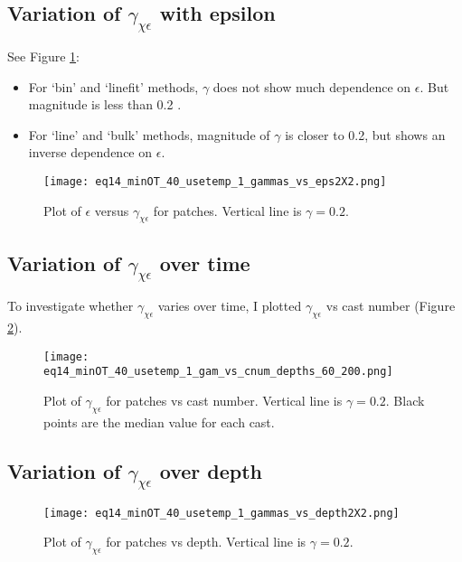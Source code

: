 \documentclass[11pt]{article}
\begin{document}
\clearpage
\subsection{Variation of $\gamma_{\chi\epsilon}$ with epsilon}

See Figure \ref{epsvsgam}:
\begin{itemize}
\item For `bin' and `linefit' methods, $\gamma$ does not show much dependence on $\epsilon$. But magnitude is less than 0.2 .
\item For `line' and `bulk' methods, magnitude of $\gamma$ is closer to 0.2, but shows an inverse dependence on $\epsilon$.
\end{itemize}


\begin{figure}[htbp]
\texttt{[image: eq14\_minOT\_40\_usetemp\_1\_gammas\_vs\_eps2X2.png]}
\caption{Plot of $\epsilon$  versus $\gamma_{\chi\epsilon}$ for patches.  Vertical line is $\gamma=0.2$.}
\label{epsvsgam}
\end{figure}




\clearpage
\subsection{Variation of $\gamma_{\chi\epsilon}$ over time}

To investigate whether $\gamma_{\chi\epsilon}$ varies over time, I plotted $\gamma_{\chi\epsilon}$ vs cast number (Figure \ref{gamvscnum}).

\begin{figure}[htbp]
\texttt{[image: eq14\_minOT\_40\_usetemp\_1\_gam\_vs\_cnum\_depths\_60\_200.png]}
\caption{Plot of $\gamma_{\chi\epsilon}$ for patches vs cast number. Vertical line is $\gamma=0.2$. Black points are the median value for each cast.}
\label{gamvscnum}
\end{figure}




\clearpage
\subsection{Variation of $\gamma_{\chi\epsilon}$ over depth}

\begin{figure}[htbp]
\texttt{[image: eq14\_minOT\_40\_usetemp\_1\_gammas\_vs\_depth2X2.png]}
\caption{Plot of $\gamma_{\chi\epsilon}$ for patches vs depth. Vertical line is $\gamma=0.2$. }
\label{gamvsdepth}
\end{figure}
\end{document}
